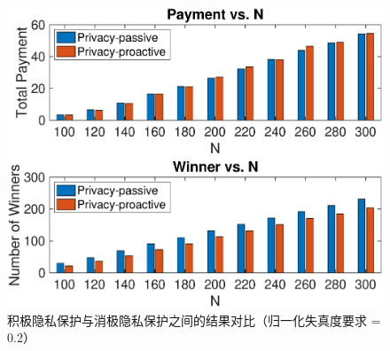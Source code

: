 	\begin{figure}[!t]
			\centering
			\includegraphics[scale=0.58]{./pic/externalities3.eps}
			\caption{积极隐私保护与消极隐私保护之间的结果对比（归一化失真度要求 = 0.2）}\label{fg:externalities2}
	\end{figure}		
	
		
		
		
	
